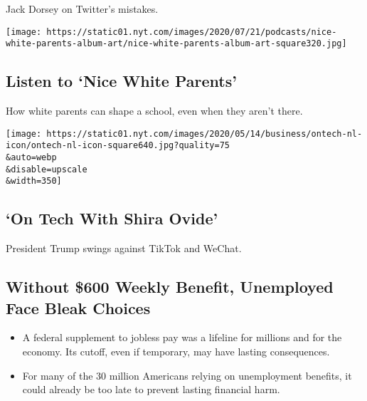 Jack Dorsey on Twitter's mistakes.

\href{/2020/08/06/podcasts/episode-three-this-is-our-school-how-dare-you.html}{}

\texttt{[image: https://static01.nyt.com/images/2020/07/21/podcasts/nice-white-parents-album-art/nice-white-parents-album-art-square320.jpg]}

\href{/2020/08/06/podcasts/episode-three-this-is-our-school-how-dare-you.html}{}

\hypertarget{listen-to-nice-white-parents}{%
\subsection{Listen to `Nice White
Parents'}\label{listen-to-nice-white-parents}}

How white parents can shape a school, even when they aren't there.

\href{/2020/08/07/technology/trump-tiktok-wechat.html}{}

\texttt{[image: https://static01.nyt.com/images/2020/05/14/business/ontech-nl-icon/ontech-nl-icon-square640.jpg?quality=75\\\&auto=webp\\\&disable=upscale\\\&width=350]}

\href{/2020/08/07/technology/trump-tiktok-wechat.html}{}

\hypertarget{on-tech-with-shira-ovide}{%
\subsection{`On Tech With Shira Ovide'}\label{on-tech-with-shira-ovide}}

President Trump swings against TikTok and WeChat.

\href{/2020/08/08/business/economy/lost-unemployment-benefits.html}{}

\hypertarget{without-600-weekly-benefit-unemployed-face-bleak-choices}{%
\subsection{Without \$600 Weekly Benefit, Unemployed Face Bleak
Choices}\label{without-600-weekly-benefit-unemployed-face-bleak-choices}}

\begin{itemize}
\tightlist
\item
  A federal supplement to jobless pay was a lifeline for millions and
  for the economy. Its cutoff, even if temporary, may have lasting
  consequences.
\item
  For many of the 30 million Americans relying on unemployment benefits,
  it could already be too late to prevent lasting financial harm.
\end{itemize}

